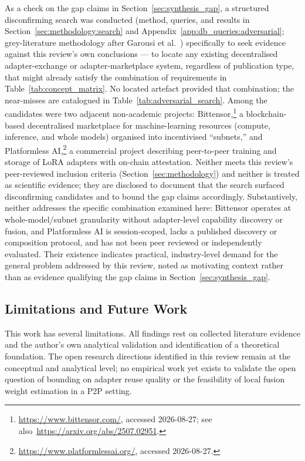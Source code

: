 As a check on the gap claims in Section~\ref{sec:synthesis_gap}, a structured
disconfirming search was conducted (method, queries, and results in
Section~\ref{sec:methodology:search} and
Appendix~\ref{app:db_queries:adversarial}; grey-literature methodology after
Garousi et al.~\cite{Garousi2019}) specifically to seek evidence against this
review's own conclusions --- to locate any existing decentralised
adapter-exchange or adapter-marketplace system, regardless of publication type,
that might already satisfy the combination of requirements in
Table~\ref{tab:concept_matrix}. No located artefact provided that combination;
the near-misses are catalogued in Table~\ref{tab:adversarial_search}. Among the
candidates were two adjacent non-academic projects: Bittensor,\footnote{\url{https://www.bittensor.com/}, accessed 2026-08-27; see also~\url{https://arxiv.org/abs/2507.02951}.} a blockchain-based decentralised
marketplace for machine-learning resources (compute, inference, and whole
models) organised into incentivised ``subnets,'' and Platformless
AI,\footnote{\url{https://www.platformlessai.org/}, accessed 2026-08-27.} a
commercial project describing peer-to-peer training and storage of LoRA
adapters with on-chain attestation. Neither meets this review's peer-reviewed
inclusion criteria (Section~\ref{sec:methodology}) and neither is treated as
scientific evidence; they are disclosed to document that the search surfaced
disconfirming candidates and to bound the gap claims accordingly.
Substantively, neither addresses the specific combination examined here:
Bittensor operates at whole-model/subnet granularity without adapter-level
capability discovery or fusion, and Platformless AI is session-scoped, lacks a
published discovery or composition protocol, and has not been peer reviewed or
independently evaluated. Their existence indicates practical, industry-level
demand for the general problem addressed by this review, noted as motivating
context rather than as evidence qualifying the gap claims in
Section~\ref{sec:synthesis_gap}.

\subsection{Limitations and Future Work}
\label{sec:conclusion:limitations}

This work has several limitations. All findings rest on collected
literature evidence and the author's own analytical validation and
identification of a theoretical foundation. The open research directions identified in this review remain at the conceptual and analytical level; no empirical work yet exists to validate the open question of bounding on adapter reuse quality or the feasibility of local fusion weight estimation in a P2P setting.

